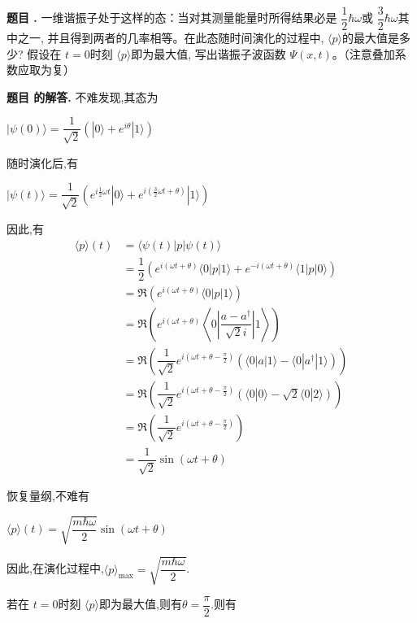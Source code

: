 \documentclass[12pt, a4paper, oneside]{ctexart}
\newcounter{problemname}
\newenvironment{problem}
  {\begin{shaded}\stepcounter{problemname}\par\noindent\textbf{题目 \theproblemname. }}
  {\end{shaded}\par}
\newenvironment{solution}
  {\par\noindent\textbf{题目 \theproblemname 的解答. }}
  {\par}
\begin{document}
\begin{problem}
  一维谐振子处于这样的态：当对其测量能量时所得结果必是 $\dfrac{1}{2}\hbar \omega$或 $\dfrac{3}{2}\hbar \omega$其中之一, 并且得到两者的几率相等。在此态随时间演化的过程中,
$\langle p \rangle$的最大值是多少? 假设在 $t = 0 $时刻 $\langle p \rangle$即为最大值, 写出谐振子波函数
$\Psi(x, t) $。（注意叠加系数应取为复）
\end{problem}

\begin{solution}
  不难发现,其态为

  \centerline{$| \psi(0) \rangle = \dfrac{1}{\sqrt{2}}(| 0 \rangle + e^{i\theta}|1 \rangle)$}

  随时演化后,有

  \centerline{$| \psi(t) \rangle = \dfrac{1}{\sqrt{2}}(e^{i\frac{1}{2} \omega t}| 0 \rangle + e^{i(\frac{3}{2} \omega t+\theta)}|1 \rangle)$}

  因此,有
  \begin{align*}
    \langle p \rangle(t) &= \langle \psi(t) | p | \psi(t) \rangle\\
    &= \dfrac{1}{2} (e^{i(\omega t+\theta)}\langle 0 | p | 1 \rangle + e^{-i(\omega t+\theta)}\langle 1 | p | 0 \rangle)\\
    &= \Re{(e^{i(\omega t+\theta)}\langle 0 | p | 1 \rangle)}\\
    &= \Re{\left(e^{i(\omega t+\theta)}\left\langle 0 \left| \left.\dfrac{a-a^\dagger}{\sqrt{2}i} \right. \right| 1 \right\rangle \right)}\\
    &= \Re \left(\dfrac{1}{\sqrt{2}}e^{i(\omega t+\theta-\frac{\pi}{2})} \left( \langle 0 | a | 1 \rangle - \langle 0 | a^\dagger | 1 \rangle\right)\right)\\
    &= \Re \left(\dfrac{1}{\sqrt{2}}e^{i(\omega t+\theta-\frac{\pi}{2})} \left( \langle 0 | 0 \rangle - \sqrt{2} \langle 0 | 2 \rangle\right)\right)\\
    &= \Re \left(\dfrac{1}{\sqrt{2}}e^{i(\omega t+\theta-\frac{\pi}{2})}\right) \\
    &= \dfrac{1}{\sqrt{2}} \sin(\omega t+\theta)
  \end{align*}

  恢复量纲,不难有

  \centerline{$\langle p \rangle(t) = \sqrt{\dfrac{m\hbar \omega}{2}}\sin(\omega t+\theta)$}

  因此,在演化过程中,$\langle p \rangle_{\mathrm{max}} = \sqrt{\dfrac{m\hbar \omega}{2}}$.

  若在 $t = 0 $时刻 $\langle p \rangle$即为最大值,则有$\theta = \dfrac{\pi}{2}$.则有


\end{solution}
\end{document}
